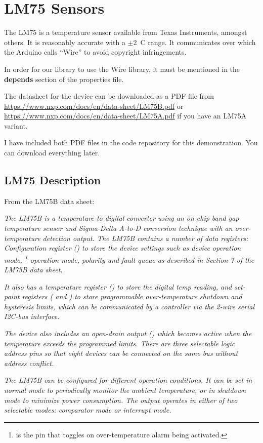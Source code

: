 \chapter{LM75 Sensors}

The LM75 is a temperature sensor available from Texas Instruments, amongst others. It is reasonably accurate with a $\pm{2}$\textdegree~C range. It communicates over \twi{} which the Arduino calls ``Wire'' to avoid copyright infringements.

In order for our library to use the Wire library, it must be mentioned in the \textbf{depends} section of the properties file.

The datasheet for the device can be downloaded as a PDF file from \url{https://www.nxp.com/docs/en/data-sheet/LM75B.pdf} or \url{https://www.nxp.com/docs/en/data-sheet/LM75A.pdf} if you have an LM75A variant.

I have included both PDF files in the code repository for this demonstration. You can download everything later.

\section{LM75 Description}

From the LM75B data sheet:

\emph{The LM75B is a temperature-to-digital converter using an on-chip band gap temperature sensor and Sigma-Delta A-to-D conversion technique with an over-temperature detection output. The LM75B contains a number of data registers: Configuration register () to store the device settings such as device operation mode, \footnote{ is the pin that toggles on over-temperature alarm being activated.} operation mode,  polarity and  fault queue as described in Section 7 of the LM75B data sheet.}

\emph{It also has a temperature register () to store the digital temp reading, and set-point registers ( and ) to store programmable over-temperature shutdown and hysteresis limits, which can be
communicated by a controller via the 2-wire serial I2C-bus interface.}

\emph{The device also includes an open-drain output () which becomes active when the temperature exceeds the programmed limits. There are three selectable logic address pins so that eight devices can be connected on the same bus without address conflict.}

\emph{The LM75B can be configured for different operation conditions. It can be set in normal mode to periodically monitor the ambient temperature, or in shutdown mode to minimize power consumption. The  output operates in either of two selectable modes:  comparator mode or  interrupt mode.}

